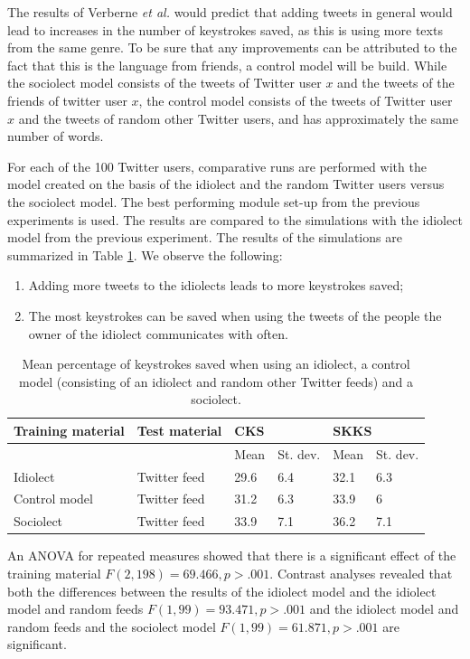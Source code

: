 \documentclass[11pt]{article}
\begin{document}
{The results of Verberne {\em et al.}  would predict that adding tweets in general would lead to increases in the number of keystrokes saved, as this is using more texts from the same genre. To be sure that any improvements can be attributed to the fact that this is the language from friends, a control model will be build. While the sociolect model consists of the tweets of Twitter user $x$ and the tweets of the friends of twitter user $x$, the control model consists of the tweets of Twitter user $x$ and the tweets of random other Twitter users, and has approximately the same number of words.

For each of the 100 Twitter users, comparative runs are performed with the model created on the basis of the idiolect and the random Twitter users versus the sociolect model. The best performing module set-up from the previous experiments is used.  The results are compared to the simulations with the idiolect model from the previous experiment. The results of the simulations are summarized in Table \ref{socio_results}.
We observe the following:

\begin{enumerate}
\item Adding more tweets to the idiolects leads to more keystrokes saved;
\item The most keystrokes can be saved when using the tweets of the people the owner of the idiolect communicates with often.
\end{enumerate}


\begin{table}[htb] 
\centering
\begin{tabular}{ll|llll} 
Training material&Test material&\multicolumn{2}{l}{CKS}&\multicolumn{2}{l}{SKKS}\\
\hline
&&Mean&St. dev.&Mean&St. dev.\\
Idiolect&Twitter feed&29.6&6.4&32.1&6.3\\
Control model&Twitter feed&31.2&6.3&33.9&6\\
Sociolect&Twitter feed&33.9&7.1&36.2&7.1\\
\end{tabular} 
\caption{Mean percentage of keystrokes saved when using an idiolect, a control model (consisting of an idiolect and random other Twitter feeds) and a sociolect.} \label{socio_results}
\end{table}


An ANOVA for repeated measures showed that there is a significant effect of the training material $F(2,198) = 69.466, p > .001$. Contrast analyses revealed that both the differences between the results of the idiolect model and the idiolect model and random feeds $F(1,99) = 93.471, p > .001$ and the idiolect model and random feeds and the sociolect model $F(1,99) = 61.871, p > .001$ are significant.

}
\end{document}
